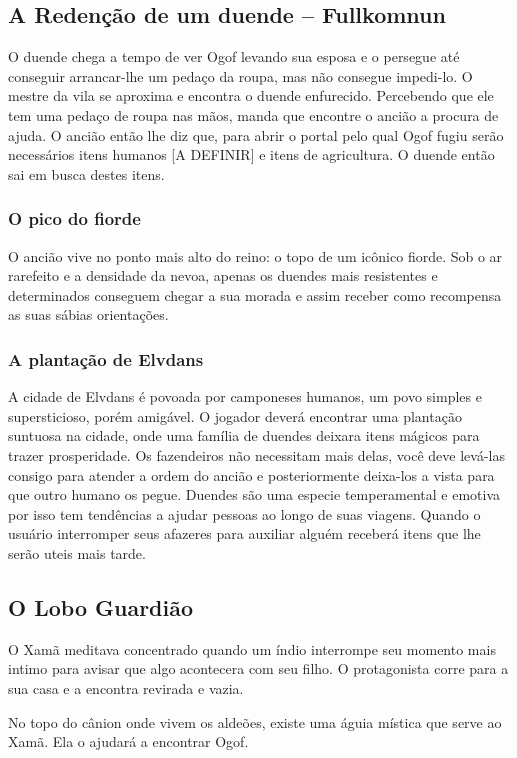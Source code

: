 \subsection{A Redenção de um duende -- Fullkomnun}
O duende chega a tempo de ver Ogof levando sua esposa e o persegue até conseguir arrancar-lhe um pedaço da roupa, mas não consegue impedi-lo. O mestre da vila se aproxima e encontra o duende enfurecido. Percebendo que ele tem uma pedaço de roupa nas mãos,  manda que encontre o ancião a procura de ajuda.
O ancião então lhe diz que, para abrir o portal pelo qual Ogof fugiu serão necessários itens humanos [A DEFINIR] e itens de agricultura. O duende então sai em busca destes itens.

\subsubsection{O pico do fiorde}
O  ancião vive no ponto mais alto do reino: o topo de um icônico fiorde. Sob o ar rarefeito e a densidade da nevoa, apenas os duendes mais resistentes e determinados conseguem chegar a sua morada e assim receber como recompensa as suas sábias orientações.

\subsubsection{A plantação de Elvdans}
A cidade de Elvdans é povoada por camponeses humanos, um povo simples e supersticioso, porém amigável. O jogador deverá encontrar uma plantação suntuosa na cidade, onde uma família de duendes deixara itens mágicos para trazer prosperidade. Os fazendeiros não necessitam mais delas, você deve levá-las consigo para atender a ordem do ancião e posteriormente deixa-los a vista para que outro humano os pegue. Duendes são uma especie temperamental e emotiva por isso tem tendências a ajudar pessoas ao longo de suas viagens. Quando o usuário interromper seus afazeres para auxiliar alguém receberá itens que lhe serão uteis mais tarde.

\subsection{O Lobo Guardião}

O Xamã meditava concentrado quando um índio interrompe seu momento mais intimo para avisar que algo acontecera com seu filho. O protagonista corre para a sua casa e a encontra revirada e vazia.

No topo do cânion onde vivem os aldeões, existe uma águia mística que serve ao Xamã. Ela o ajudará a encontrar Ogof.

